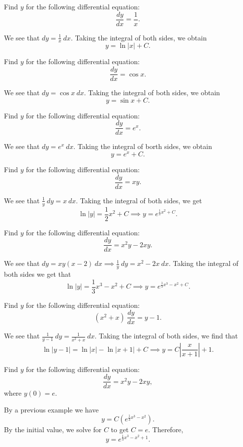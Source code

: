 \begin{example}
    Find $y$ for the following differential equation:
    $$\frac{dy}{dx} = \frac{1}{x}.$$
\end{example}
\begin{soln}
    We see that $dy = \frac{1}{x} ~ dx$. Taking the integral of both sides,
    we obtain $$y = \ln|x| + C.$$
\end{soln}
\begin{example}
    Find $y$ for the following differential equation:
    $$\frac{dy}{dx} = \cos x.$$
\end{example}
\begin{soln}
    We see that $dy = \cos x ~ dx$. Taking the integral of both sides, we obtain
    $$\boxed{y = \sin x + C}.$$
\end{soln}
\begin{example}
    Find $y$ for the following differential equation:
    $$\frac{dy}{dx} = e^x.$$
\end{example}
\begin{soln}
    We see that $dy = e^x ~ dx$. Taking the integral of borth sides, we obtain
    $$\boxed{y =  e^x + C}.$$
\end{soln}
\begin{example}
    Find $y$ for the following differential equation: 
    $$\frac{dy}{dx} = xy.$$
\end{example}
\begin{soln}
    We see that $\frac{1}{y} ~ dy  = x ~ dx$. Taking the integral of
    both sides, we get
    $$\ln |y| = \frac{1}{2}x^2 + C \implies y = e^{\frac{1}{2}x^2+C}.$$
\end{soln}
\begin{example}
    Find $y$ for the following differential equation:
    $$\frac{dy}{dx} = x^2y-2xy.$$
\end{example}
\begin{soln}
    We see that $dy = xy(x-2) ~ dx \implies \frac{1}{y} ~dy= x^2-2x ~ dx$.
    Taking the integral of both sides we get that
    $$\ln |y| = \frac{1}{3}x^3-x^2 + C \implies y = e^{\frac{1}{3}x^3-x^2 + C}.$$
\end{soln}
\begin{example}
    Find $y$ for the following differential equation:
    $$(x^2+x)~\frac{dy}{dx} = y-1.$$
\end{example}
\begin{soln}
    We see that $\frac{1}{y-1} ~ dy = \frac{1}{x^2+x} ~ dx$. Taking the
    integral of both sides, we find that
    $$\ln|y-1| = \ln|x|-\ln|x+1| +C\implies y = C\left|\frac{x}{x+1}\right|+1.$$
\end{soln}
\begin{example}
    Find $y$ for the following differential equation:
    $$\frac{dy}{dx} = x^2y-2xy,$$
    where $y(0) = e$.
\end{example}
\begin{soln}
    By a previous example we have $$y = C\left(e^{\frac{1}{3}x^3-x^2}\right).$$
    By the initial value, we solve for $C$ to get $C = e$. Therefore,
    $$\boxed{y = e^{\frac{1}{3}x^3-x^2+1}}.$$
\end{soln}
